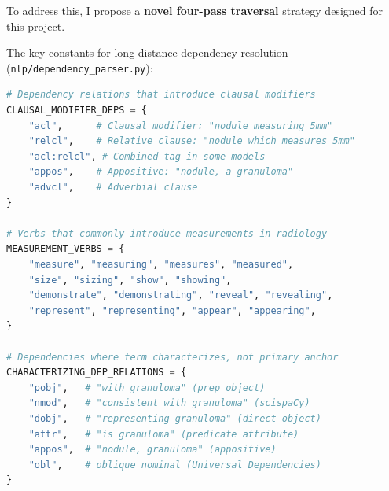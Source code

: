 \documentclass[12pt]{article}
\begin{document}
To address this, I propose a \textbf{novel four-pass traversal} strategy designed for this project.

The key constants for long-distance dependency resolution (\texttt{nlp/dependency\_parser.py}):

\begin{lstlisting}[language=Python, caption={Clausal modifier dependencies and measurement verbs.}]
# Dependency relations that introduce clausal modifiers
CLAUSAL_MODIFIER_DEPS = {
    "acl",      # Clausal modifier: "nodule measuring 5mm"
    "relcl",    # Relative clause: "nodule which measures 5mm"
    "acl:relcl", # Combined tag in some models
    "appos",    # Appositive: "nodule, a granuloma"
    "advcl",    # Adverbial clause
}

# Verbs that commonly introduce measurements in radiology
MEASUREMENT_VERBS = {
    "measure", "measuring", "measures", "measured",
    "size", "sizing", "show", "showing",
    "demonstrate", "demonstrating", "reveal", "revealing",
    "represent", "representing", "appear", "appearing",
}

# Dependencies where term characterizes, not primary anchor
CHARACTERIZING_DEP_RELATIONS = {
    "pobj",   # "with granuloma" (prep object)
    "nmod",   # "consistent with granuloma" (scispaCy)
    "dobj",   # "representing granuloma" (direct object)
    "attr",   # "is granuloma" (predicate attribute)
    "appos",  # "nodule, granuloma" (appositive)
    "obl",    # oblique nominal (Universal Dependencies)
}
\end{lstlisting}
\end{document}
